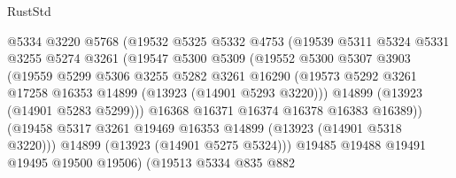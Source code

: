 \begin{lexlean}{RustStd}
\begin{coremodule}
                            @5334
                            @3220
                            @5768
                            (@19532
                              @5325
                              @5332
                              @4753
                              (@19539
                                @5311
                                @5324
                                @5331
                                @3255
                                @5274
                                @3261
                                (@19547
                                  @5300
                                  @5309
                                  (@19552
                                    @5300
                                    @5307
                                    @3903
                                    (@19559
                                      @5299
                                      @5306
                                      @3255
                                      @5282
                                      @3261
                                      @16290
                                      (@19573
                                        @5292
                                        @3261
                                        @17258
                                        @16353
                                        @14899
                                        (@13923 (@14901 @5293 @3220)))
                                      @14899
                                      (@13923 (@14901 @5283 @5299)))
                                    @16368
                                    @16371
                                    @16374
                                    @16378
                                    @16383
                                    @16389))
                                (@19458
                                  @5317
                                  @3261
                                  @19469
                                  @16353
                                  @14899
                                  (@13923 (@14901 @5318 @3220)))
                                @14899
                                (@13923 (@14901 @5275 @5324)))
                              @19485
                              @19488
                              @19491
                              @19495
                              @19500
                              @19506)
                            (@19513
                              @5334
                              @835
                              @882

\end{coremodule}
\end{lexlean}
